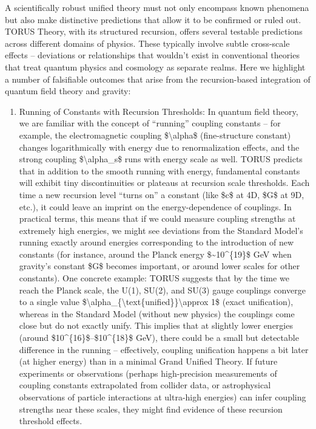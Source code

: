 \documentclass[]{article}
\begin{document}
A scientifically robust unified theory must not only encompass known
phenomena but also make distinctive predictions that allow it to be
confirmed or ruled out. TORUS Theory, with its structured recursion,
offers several testable predictions across different domains of physics.
These typically involve subtle cross-scale effects -- deviations or
relationships that wouldn't exist in conventional theories that treat
quantum physics and cosmology as separate realms. Here we highlight a
number of falsifiable outcomes that arise from the recursion-based
integration of quantum field theory and gravity:

\begin{enumerate}
\def\labelenumi{\arabic{enumi}.}
\item
  Running of Constants with Recursion Thresholds: In quantum field
  theory, we are familiar with the concept of ``running'' coupling
  constants -- for example, the electromagnetic coupling
  \$\textbackslash{}alpha\$ (fine-structure constant) changes
  logarithmically with energy due to renormalization effects, and the
  strong coupling \$\textbackslash{}alpha\_s\$ runs with energy scale as
  well. TORUS predicts that in addition to the smooth running with
  energy, fundamental constants will exhibit tiny discontinuities or
  plateaus at recursion scale thresholds. Each time a new recursion
  level ``turns on'' a constant (like \$c\$ at 4D, \$G\$ at 9D, etc.),
  it could leave an imprint on the energy-dependence of couplings. In
  practical terms, this means that if we could measure coupling
  strengths at extremely high energies, we might see deviations from the
  Standard Model's running exactly around energies corresponding to the
  introduction of new constants (for instance, around the Planck energy
  \$\textasciitilde{}10\^{}\{19\}\$ GeV when gravity's constant \$G\$
  becomes important, or around lower scales for other constants). One
  concrete example: TORUS suggests that by the time we reach the Planck
  scale, the U(1), SU(2), and SU(3) gauge couplings converge to a single
  value
  \$\textbackslash{}alpha\_\{\textbackslash{}text\{unified\}\}\textbackslash{}approx
  1\$ (exact unification), whereas in the Standard Model (without new
  physics) the couplings come close but do not exactly unify. This
  implies that at slightly lower energies (around
  \$10\^{}\{16\}\$--\$10\^{}\{18\}\$ GeV), there could be a small but
  detectable difference in the running -- effectively, coupling
  unification happens a bit later (at higher energy) than in a minimal
  Grand Unified Theory. If future experiments or observations (perhaps
  high-precision measurements of coupling constants extrapolated from
  collider data, or astrophysical observations of particle interactions
  at ultra-high energies) can infer coupling strengths near these
  scales, they might find evidence of these recursion threshold effects.
\end{enumerate}
\end{document}
